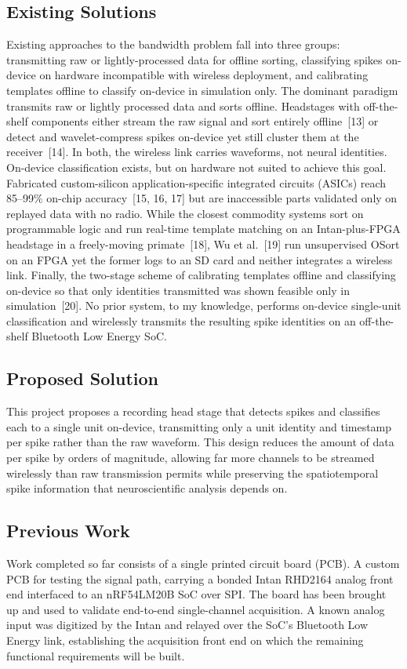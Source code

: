\documentclass[11pt]{article}
\begin{document}
\subsection{Existing Solutions}
Existing approaches to the bandwidth problem fall into three groups: transmitting raw or
lightly-processed data for offline sorting, classifying spikes on-device on hardware
incompatible with wireless deployment, and calibrating templates offline to classify 
on-device in simulation only. The dominant paradigm transmits raw or lightly processed 
data and sorts offline. Headstages with off-the-shelf components either stream the raw 
signal and sort entirely offline~[13] or detect and wavelet-compress spikes on-device yet 
still cluster them at the receiver~[14]. In both, the wireless link carries waveforms, not 
neural identities. On-device classification exists, but on hardware not suited to achieve 
this goal. Fabricated custom-silicon application-specific integrated circuits (ASICs) 
reach 85--99\% on-chip accuracy~[15, 16, 17] but are inaccessible parts validated only on
replayed data with no radio. While the closest commodity systems sort on programmable logic
and run real-time template matching on an Intan-plus-FPGA headstage in a freely-moving
primate~[18], Wu et al.~[19] run unsupervised OSort on an FPGA yet the former logs to an SD
card and neither integrates a wireless link. Finally, the two-stage scheme of calibrating
templates offline and classifying on-device so that only identities transmitted was
shown feasible only in simulation~[20]. No prior system, to my knowledge, performs
on-device single-unit classification and wirelessly transmits the resulting spike
identities on an off-the-shelf Bluetooth Low Energy SoC.

\subsection{Proposed Solution}
This project proposes a recording head stage that detects spikes and classifies each to a
single unit on-device, transmitting only a unit identity and timestamp per spike
rather than the raw waveform. This design reduces the amount of data per spike by orders 
of magnitude, allowing far more channels to be streamed wirelessly than raw transmission 
permits while preserving the spatiotemporal spike information that neuroscientific analysis depends on.

\subsection{Previous Work}
Work completed so far consists of a single printed circuit board (PCB). A custom PCB
for testing the signal path, carrying a bonded Intan RHD2164 analog front end
interfaced to an nRF54LM20B SoC over SPI. The board has been brought up and used to
validate end-to-end single-channel acquisition. A known analog input was digitized by 
the Intan and relayed over the SoC's Bluetooth Low Energy link, establishing the acquisition 
front end on which the remaining functional requirements will be built.
\end{document}
